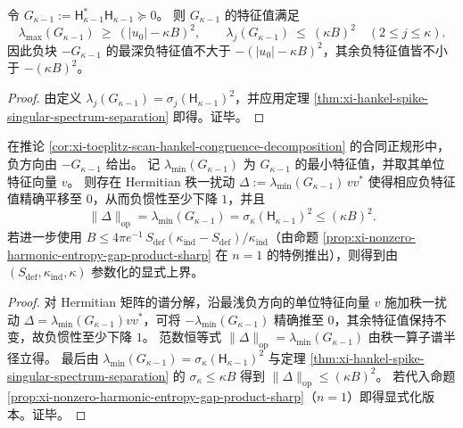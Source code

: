 \begin{corollary}[负块谱的单尖峰与浅负谱上界]\label{cor:xi-negative-block-spectrum-spike-and-shallow-bound}
令 \(G_{\kappa-1}:=\mathsf H_{\kappa-1}^{\ast}\mathsf H_{\kappa-1}\succeq 0\)。
则 \(G_{\kappa-1}\) 的特征值满足
\[
\lambda_{\max}(G_{\kappa-1})\ \ge\ (|u_0|-\kappa B)^2,
\qquad
\lambda_j(G_{\kappa-1})\ \le\ (\kappa B)^2\quad(2\le j\le \kappa).
\]
因此负块 \(-G_{\kappa-1}\) 的最深负特征值不大于 \(-(|u_0|-\kappa B)^2\)，其余负特征值皆不小于 \(-(\kappa B)^2\)。
\end{corollary}
\begin{proof}
由定义 \(\lambda_j(G_{\kappa-1})=\sigma_j(\mathsf H_{\kappa-1})^2\)，并应用定理 \ref{thm:xi-hankel-spike-singular-spectrum-separation} 即得。证毕。
\end{proof}
\begin{proposition}[浅负谱方向的秩一可消去半径]\label{prop:xi-rankone-flip-radius-shallow-negative}
在推论 \ref{cor:xi-toeplitz-scan-hankel-congruence-decomposition} 的合同正规形中，负方向由 \(-G_{\kappa-1}\) 给出。
记 \(\lambda_{\min}(G_{\kappa-1})\) 为 \(G_{\kappa-1}\) 的最小特征值，并取其单位特征向量 \(v\)。
则存在 Hermitian 秩一扰动
\(
\Delta:=\lambda_{\min}(G_{\kappa-1})\,vv^{\ast}
\)
使得相应负特征值精确平移至 \(0\)，从而负惯性至少下降 \(1\)，并且
\[
\|\Delta\|_{\mathrm{op}}=\lambda_{\min}(G_{\kappa-1})
=\sigma_\kappa(\mathsf H_{\kappa-1})^2
\le
(\kappa B)^2.
\]
若进一步使用 \(B\le 4\pi e^{-1}\,S_{\mathrm{def}}(\kappa_{\mathrm{ind}}-S_{\mathrm{def}})/\kappa_{\mathrm{ind}}\)（由命题 \ref{prop:xi-nonzero-harmonic-entropy-gap-product-sharp} 在 \(n=1\) 的特例推出），则得到由 \((S_{\mathrm{def}},\kappa_{\mathrm{ind}},\kappa)\) 参数化的显式上界。
\end{proposition}
\begin{proof}
对 Hermitian 矩阵的谱分解，沿最浅负方向的单位特征向量 \(v\) 施加秩一扰动 \(\Delta=\lambda_{\min}(G_{\kappa-1})vv^{\ast}\)，可将 \(-\lambda_{\min}(G_{\kappa-1})\) 精确推至 \(0\)，其余特征值保持不变，故负惯性至少下降 \(1\)。
范数恒等式 \(\|\Delta\|_{\mathrm{op}}=\lambda_{\min}(G_{\kappa-1})\) 由秩一算子谱半径立得。
最后由 \(\lambda_{\min}(G_{\kappa-1})=\sigma_\kappa(\mathsf H_{\kappa-1})^2\) 与定理 \ref{thm:xi-hankel-spike-singular-spectrum-separation} 的 \(\sigma_\kappa\le \kappa B\) 得到 \(\|\Delta\|_{\mathrm{op}}\le (\kappa B)^2\)。
若代入命题 \ref{prop:xi-nonzero-harmonic-entropy-gap-product-sharp}（\(n=1\)）即得显式化版本。证毕。
\end{proof}

